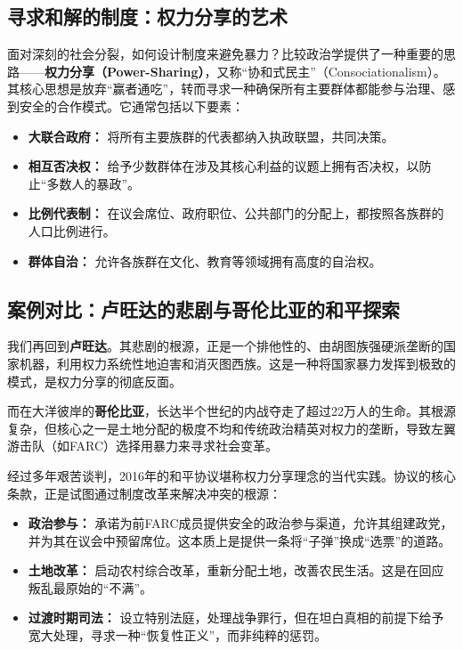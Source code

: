 \documentclass[a5paper, 11pt, openany]{ctexbook}
\begin{document}
\subsection{寻求和解的制度：权力分享的艺术}

面对深刻的社会分裂，如何设计制度来避免暴力？比较政治学提供了一种重要的思路——\textbf{权力分享（Power-Sharing）}，又称“协和式民主”（Consociationalism）。其核心思想是放弃“赢者通吃”，转而寻求一种确保所有主要群体都能参与治理、感到安全的合作模式。它通常包括以下要素：
\begin{itemize}
    \item \textbf{大联合政府：} 将所有主要族群的代表都纳入执政联盟，共同决策。
    \item \textbf{相互否决权：} 给予少数群体在涉及其核心利益的议题上拥有否决权，以防止“多数人的暴政”。
    \item \textbf{比例代表制：} 在议会席位、政府职位、公共部门的分配上，都按照各族群的人口比例进行。
    \item \textbf{群体自治：} 允许各族群在文化、教育等领域拥有高度的自治权。
\end{itemize}

\subsection{案例对比：卢旺达的悲剧与哥伦比亚的和平探索}

我们再回到\textbf{卢旺达}。其悲剧的根源，正是一个排他性的、由胡图族强硬派垄断的国家机器，利用权力系统性地迫害和消灭图西族。这是一种将国家暴力发挥到极致的模式，是权力分享的彻底反面。

而在大洋彼岸的\textbf{哥伦比亚}，长达半个世纪的内战夺走了超过22万人的生命。其根源复杂，但核心之一是土地分配的极度不均和传统政治精英对权力的垄断，导致左翼游击队（如FARC）选择用暴力来寻求社会变革。

经过多年艰苦谈判，2016年的和平协议堪称权力分享理念的当代实践。协议的核心条款，正是试图通过制度改革来解决冲突的根源：
\begin{itemize}
    \item \textbf{政治参与：} 承诺为前FARC成员提供安全的政治参与渠道，允许其组建政党，并为其在议会中预留席位。这本质上是提供一条将“子弹”换成“选票”的道路。
    \item \textbf{土地改革：} 启动农村综合改革，重新分配土地，改善农民生活。这是在回应叛乱最原始的“不满”。
    \item \textbf{过渡时期司法：} 设立特别法庭，处理战争罪行，但在坦白真相的前提下给予宽大处理，寻求一种“恢复性正义”，而非纯粹的惩罚。
\end{itemize}
\end{document}
